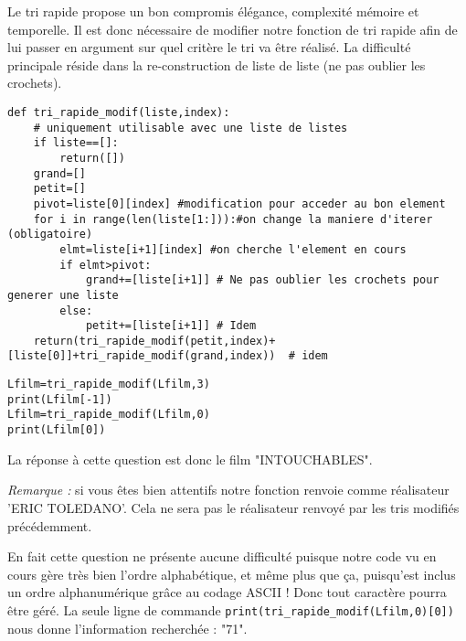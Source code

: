 \ifprof
Le tri rapide propose un bon compromis élégance, complexité mémoire et temporelle.
Il est donc nécessaire de modifier notre fonction de tri rapide afin de lui passer en argument sur quel critère le tri va être réalisé. La difficulté principale réside dans la re-construction de liste de liste (ne pas oublier les crochets). 
\else
\fi

\ifprof
\begin{lstlisting}
def tri_rapide_modif(liste,index):
    # uniquement utilisable avec une liste de listes
    if liste==[]:
        return([])
    grand=[]
    petit=[]
    pivot=liste[0][index] #modification pour acceder au bon element
    for i in range(len(liste[1:])):#on change la maniere d'iterer (obligatoire)
        elmt=liste[i+1][index] #on cherche l'element en cours
        if elmt>pivot:
            grand+=[liste[i+1]] # Ne pas oublier les crochets pour generer une liste
        else:
            petit+=[liste[i+1]] # Idem
    return(tri_rapide_modif(petit,index)+[liste[0]]+tri_rapide_modif(grand,index))  # idem
\end{lstlisting}

\begin{lstlisting}
Lfilm=tri_rapide_modif(Lfilm,3) 
print(Lfilm[-1])
Lfilm=tri_rapide_modif(Lfilm,0) 
print(Lfilm[0])
\end{lstlisting}
La réponse à cette question est donc le film "INTOUCHABLES".

\textit{Remarque :} si vous êtes bien attentifs notre fonction renvoie comme réalisateur 'ERIC TOLEDANO'. Cela ne sera pas le réalisateur renvoyé par les tris modifiés  précédemment.

\else
\fi

\ifprof
En fait cette question ne présente aucune difficulté puisque notre code vu en cours gère très bien l'ordre alphabétique, et même plus que ça, puisqu'est inclus un ordre alphanumérique grâce au codage ASCII ! Donc tout caractère pourra être géré. La seule ligne de commande \texttt{print(tri\_rapide\_modif(Lfilm,0)[0])} nous donne l'information recherchée : "71".
\else
\fi

